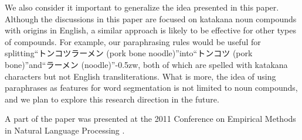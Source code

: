 \documentclass[english]{jnlp_1.4_rep}
\begin{document}
We also consider it important to generalize the idea presented in
this paper. Although the discussions in this paper are focused on
katakana noun compounds with origins in English, a similar approach is
likely to be effective for other types of compounds. For example, our
paraphrasing rules would be useful for splitting“トンコツラーメン
(pork bone noodle)”into“トンコツ (pork bone)”and“ラーメン
(noodle)”{\kern-0.5zw}, both of which are spelled with katakana characters but not
English transliterations. What is more, the idea of using paraphrases as
features for word segmentation is not limited to noun compounds, and we
plan to explore this research direction in the future.


\acknowledgment

A part of the paper was presented at the 2011 Conference on Empirical
Methods in Natural Language Processing \cite{Kaji11}.
\end{document}
